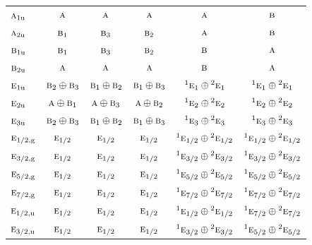 \documentclass[10pt,a4paper]{article}
\numberwithin{equation}{section}
\newcommand{\irr}[1]{\text{\normalfont\scshape #1}}
\newcommand{\conjpair}[1]{{}^{#1}}
\newcommand{\ptag}[1]{\mathrm{#1}}
\begin{document}
{\begin{longtable}{@{}lccccc@{}}
$\irr{a}_{1\ptag{u}}$ & $\irr{a}$ & $\irr{a}$ & $\irr{a}$ & $\irr{a}$ & $\irr{b}$\\
$\irr{a}_{2\ptag{u}}$ & $\irr{b}_{1}$ & $\irr{b}_{3}$ & $\irr{b}_{2}$ & $\irr{a}$ & $\irr{b}$\\
$\irr{b}_{1\ptag{u}}$ & $\irr{b}_{1}$ & $\irr{b}_{3}$ & $\irr{b}_{2}$ & $\irr{b}$ & $\irr{a}$\\
$\irr{b}_{2\ptag{u}}$ & $\irr{a}$ & $\irr{a}$ & $\irr{a}$ & $\irr{b}$ & $\irr{a}$\\
$\irr{e}_{1\ptag{u}}$ & $\irr{b}_{2}\oplus \irr{b}_{3}$ & $\irr{b}_{1}\oplus \irr{b}_{2}$ & $\irr{b}_{1}\oplus \irr{b}_{3}$ & $\conjpair{1}\irr{e}_{1}\oplus \conjpair{2}\irr{e}_{1}$ & $\conjpair{1}\irr{e}_{1}\oplus \conjpair{2}\irr{e}_{1}$\\
$\irr{e}_{2\ptag{u}}$ & $\irr{a}\oplus \irr{b}_{1}$ & $\irr{a}\oplus \irr{b}_{3}$ & $\irr{a}\oplus \irr{b}_{2}$ & $\conjpair{1}\irr{e}_{2}\oplus \conjpair{2}\irr{e}_{2}$ & $\conjpair{1}\irr{e}_{2}\oplus \conjpair{2}\irr{e}_{2}$\\
$\irr{e}_{3\ptag{u}}$ & $\irr{b}_{2}\oplus \irr{b}_{3}$ & $\irr{b}_{1}\oplus \irr{b}_{2}$ & $\irr{b}_{1}\oplus \irr{b}_{3}$ & $\conjpair{1}\irr{e}_{3}\oplus \conjpair{2}\irr{e}_{3}$ & $\conjpair{1}\irr{e}_{3}\oplus \conjpair{2}\irr{e}_{3}$\\
$\irr{e}_{1/2,\ptag{g}}$ & $\irr{e}_{1/2}$ & $\irr{e}_{1/2}$ & $\irr{e}_{1/2}$ & $\conjpair{1}\irr{e}_{1/2}\oplus \conjpair{2}\irr{e}_{1/2}$ & $\conjpair{1}\irr{e}_{1/2}\oplus \conjpair{2}\irr{e}_{1/2}$\\
$\irr{e}_{3/2,\ptag{g}}$ & $\irr{e}_{1/2}$ & $\irr{e}_{1/2}$ & $\irr{e}_{1/2}$ & $\conjpair{1}\irr{e}_{3/2}\oplus \conjpair{2}\irr{e}_{3/2}$ & $\conjpair{1}\irr{e}_{3/2}\oplus \conjpair{2}\irr{e}_{3/2}$\\
$\irr{e}_{5/2,\ptag{g}}$ & $\irr{e}_{1/2}$ & $\irr{e}_{1/2}$ & $\irr{e}_{1/2}$ & $\conjpair{1}\irr{e}_{5/2}\oplus \conjpair{2}\irr{e}_{5/2}$ & $\conjpair{1}\irr{e}_{5/2}\oplus \conjpair{2}\irr{e}_{5/2}$\\
$\irr{e}_{7/2,\ptag{g}}$ & $\irr{e}_{1/2}$ & $\irr{e}_{1/2}$ & $\irr{e}_{1/2}$ & $\conjpair{1}\irr{e}_{7/2}\oplus \conjpair{2}\irr{e}_{7/2}$ & $\conjpair{1}\irr{e}_{7/2}\oplus \conjpair{2}\irr{e}_{7/2}$\\
$\irr{e}_{1/2,\ptag{u}}$ & $\irr{e}_{1/2}$ & $\irr{e}_{1/2}$ & $\irr{e}_{1/2}$ & $\conjpair{1}\irr{e}_{1/2}\oplus \conjpair{2}\irr{e}_{1/2}$ & $\conjpair{1}\irr{e}_{7/2}\oplus \conjpair{2}\irr{e}_{7/2}$\\
$\irr{e}_{3/2,\ptag{u}}$ & $\irr{e}_{1/2}$ & $\irr{e}_{1/2}$ & $\irr{e}_{1/2}$ & $\conjpair{1}\irr{e}_{3/2}\oplus \conjpair{2}\irr{e}_{3/2}$ & $\conjpair{1}\irr{e}_{5/2}\oplus \conjpair{2}\irr{e}_{5/2}$\\

\end{longtable}}
\end{document}
